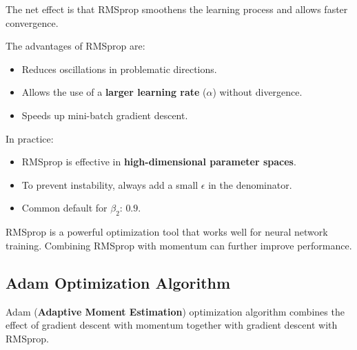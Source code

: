 \documentclass[letterpaper,12pt,notitlepage,twoside]{report}
\begin{document}
The net effect is that RMSprop smoothens the learning process and allows faster convergence.

The advantages of RMSprop are:
\begin{itemize}[nosep]
    \item Reduces oscillations in problematic directions.
    \item Allows the use of a \textbf{larger learning rate} (\( \alpha \)) without divergence.
    \item Speeds up mini-batch gradient descent.
\end{itemize}

In practice:
\begin{itemize}[noitemsep, topsep=0pt]
    \item RMSprop is effective in \textbf{high-dimensional parameter spaces}.
    \item To prevent instability, always add a small \( \epsilon \) in the denominator.
    \item Common default for \( \beta_2 \): \( 0.9 \).
\end{itemize}

RMSprop is a powerful optimization tool that works well for neural network training. Combining RMSprop with momentum can further improve performance.

\subsection*{Adam Optimization Algorithm}
Adam (\textbf{Adaptive Moment Estimation}) optimization algorithm combines the effect of gradient descent with momentum together with gradient descent with RMSprop.
\end{document}
